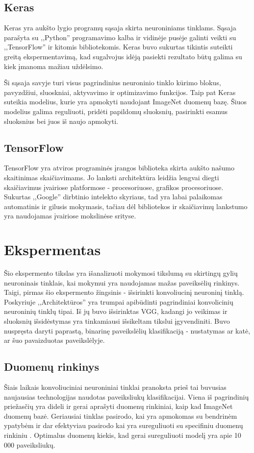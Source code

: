 \documentclass{VUMIFPSkursinis}
\begin{document}
\subsection{Keras}
Keras yra aukšto lygio programų sąsaja skirta neuroniniams tinklams. Sąsaja parašyta su ,,Python'' programavimo kalba ir vidinėje pusėje galinti veikti su ,,TensorFlow'' 
ir kitomis bibliotekomis. Keras buvo sukurtas tikintis suteikti greitą ekspermentavimą, kad sugalvojus idėją pasiekti rezultato būtų galima su kiek įmanoma mažiau uždėlsimo.

Ši sąsaja savyje turi visus pagrindinius neuroninio tinklo kūrimo blokus, pavyzdžiui, sluoskniai, aktyvavimo ir optimizavimo funkcijos. Taip pat Keras suteikia modelius, 
kurie yra apmokyti naudojant ImageNet duomenų bazę. Šiuos modelius galima reguliuoti, pridėti papildomų sluoksnių, pasirinkti esamus sluoksnius bei juos iš naujo apmokyti.

\subsection{TensorFlow}
TensorFlow yra atviros programinės įrangos biblioteka skirta aukšto našumo skaitinimas skaičiavimams. Jo lanksti architektūra leidžia lengvai diegti skaičiavimus įvairiose 
platformose - procesoriuose, grafikos procesoriuose. Sukurtas ,,Google'' dirbtinio intelekto skyriaus, tad yra labai palaikomas automatinis ir gilusis mokymasis, tačiau 
dėl bibliotekos ir skaičiavimų lankstumo yra naudojamas įvairiose mokslinėse srityse.

\section{Ekspermentas}
Šio ekspermento tikslas yra išanalizuoti mokymosi tikslumą su skirtingų gylių neuroninais tinklais, kai mokymui yra naudojamas mažas paveiksėlių rinkinys. Taigi, pirmas šio ekspermento žingsinis - išsirinkti konvoliucinį neuroninį tinklą. Poskyriuje ,,Architektūros'' yra trumpai apibūdinti pagrindiniai konvolicinių neuroninių tinklų tipai. Iš jų buvo išsirinktas VGG, kadangi jo veikimas ir sluoksnių išsidėstymas yra tinkamiausi išsikeltam tikslui įgyvendiniti. Buvo nuspręsta daryti paprastą, binarinę paveikslėlių klasifikaciją - nustatymas ar katė, ar šuo pavaizduotas paveikslėlyje.

\subsection{Duomenų rinkinys}
Šiais laikais konvoliuciniai neuroniniai tinklai pranoksta prieš tai buvusias naujausias technologijas naudotas paveiksliukų klasifikacijai. Viena iš pagrindinių priežasčių yra dideli ir gerai aprašyti duomenų rinkiniai, kaip kad ImageNet duomenų bazė. Geriausiai tinklas pasirodo, kai yra apmokomas su bendrinėm ypatybėm ir dar efektyviau pasirodo kai yra sureguliuoti su specifiniu duomenų rinkiniu \cite{http://adas.cvc.uab.es/task-cv2016/papers/0002.pdf}. Optimalus duomenų kiekis, kad gerai sureguliuoti modelį yra apie 10 000 paveiksliukų. 
\end{document}
